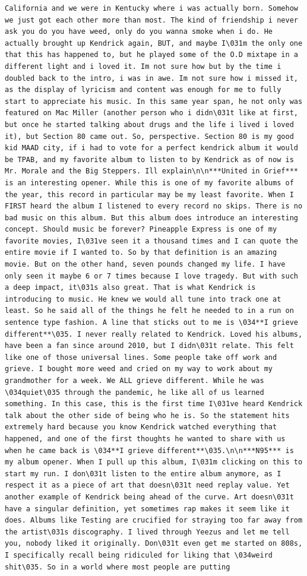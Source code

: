 \documentclass[
  letterpaper,
  DIV=11,
  numbers=noendperiod]{scrreprt}
\begin{document}
\begin{verbatim}
California and we were in Kentucky where i was actually born. Somehow we just got each other more than most. The kind of friendship i never ask you do you have weed, only do you wanna smoke when i do. He actually brought up Kendrick again, BUT, and maybe I\031m the only one that this has happened to, but he played some of the O.D mixtape in a different light and i loved it. Im not sure how but by the time i doubled back to the intro, i was in awe. Im not sure how i missed it, as the display of lyricism and content was enough for me to fully start to appreciate his music. In this same year span, he not only was featured on Mac Miller (another person who i didn\031t like at first, but once he started talking about drugs and the life i lived i loved it), but Section 80 came out. So, perspective. Section 80 is my good kid MAAD city, if i had to vote for a perfect kendrick album it would be TPAB, and my favorite album to listen to by Kendrick as of now is Mr. Morale and the Big Steppers. Ill explain\n\n***United in Grief*** is an interesting opener. While this is one of my favorite albums of the year, this record in particular may be my least favorite. When I FIRST heard the album I listened to every record no skips. There is no bad music on this album. But this album does introduce an interesting concept. Should music be forever? Pineapple Express is one of my favorite movies, I\031ve seen it a thousand times and I can quote the entire movie if I wanted to. So by that definition is an amazing movie. But on the other hand, seven pounds changed my life. I have only seen it maybe 6 or 7 times because I love tragedy. But with such a deep impact, it\031s also great. That is what Kendrick is introducing to music. He knew we would all tune into track one at least. So he said all of the things he felt he needed to in a run on sentence type fashion. A line that sticks out to me is \034**I grieve different**\035. I never really related to Kendrick. Loved his albums, have been a fan since around 2010, but I didn\031t relate. This felt like one of those universal lines. Some people take off work and grieve. I bought more weed and cried on my way to work about my grandmother for a week. We ALL grieve different. While he was \034quiet\035 through the pandemic, he like all of us learned something. In this case, this is the first time I\031ve heard Kendrick talk about the other side of being who he is. So the statement hits extremely hard because you know Kendrick watched everything that happened, and one of the first thoughts he wanted to share with us when he came back is \034**I grieve different**\035.\n\n***N95*** is my album opener. When I pull up this album, I\031m clicking on this to start my run. I don\031t listen to the entire album anymore, as I respect it as a piece of art that doesn\031t need replay value. Yet another example of Kendrick being ahead of the curve. Art doesn\031t have a singular definition, yet sometimes rap makes it seem like it does. Albums like Testing are crucified for straying too far away from the artist\031s discography. I lived through Yeezus and let me tell you, nobody liked it originally. Don\031t even get me started on 808s, I specifically recall being ridiculed for liking that \034weird shit\035. So in a world where most people are putting 
\end{verbatim}
\end{document}
